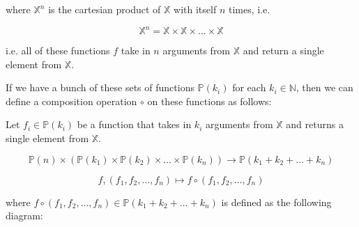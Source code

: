 where $\mathbb{X}^n$ is the cartesian product of $\mathbb{X}$ with itself $n$ times, i.e.

\begin{equation}
  \mathbb{X}^n = \mathbb{X} \times \mathbb{X} \times \ldots \times \mathbb{X}
\end{equation}

i.e. all of these functions $f$ take in $n$ arguments from $\mathbb{X}$ and return a single element from $\mathbb{X}$.

\begin{figure}[h]
\centering
\end{figure}

If we have a bunch of these sets of functions $\mathbb{P}(k_i)$ for each $k_i \in \mathbb{N}$, then we can define a composition operation $\circ$ on these functions as follows:

Let $f_i \in \mathbb{P}(k_i)$ be a function that takes in $k_i$ arguments from $\mathbb{X}$ and returns a single element from $\mathbb{X}$.

\begin{equation}
    \mathbb{P}(n) \times ( \mathbb{P}(k_1) \times \mathbb{P}(k_2) \times \ldots \times \mathbb{P}(k_n) ) \to \mathbb{P}(k_1 + k_2 + \ldots + k_n)
\end{equation}

\begin{equation}
    f, (f_1, f_2, \ldots, f_n) \mapsto f \circ (f_1, f_2, \ldots, f_n)
\end{equation}

where $f \circ (f_1, f_2, \ldots, f_n) \in \mathbb{P}(k_1 + k_2 + \ldots + k_n)$ is defined as the following diagram:

